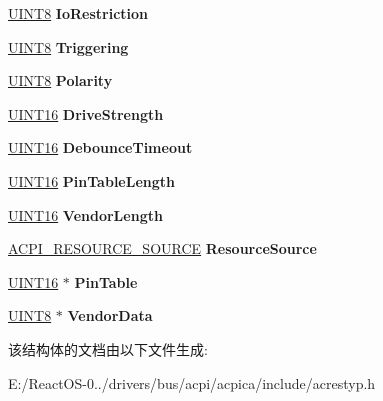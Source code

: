 \begin{DoxyCompactItemize}
\hyperlink{_processor_bind_8h_ab27e9918b538ce9d8ca692479b375b6a}{U\+I\+N\+T8} {\bfseries Io\+Restriction}
\item 
\mbox{\label{structacpi__resource__gpio_a98a0b04b774d7a3d01d40eff5d44b8b1}} 
\hyperlink{_processor_bind_8h_ab27e9918b538ce9d8ca692479b375b6a}{U\+I\+N\+T8} {\bfseries Triggering}
\item 
\mbox{\label{structacpi__resource__gpio_a53ef6838ddfede6fe363c161d59e01bc}} 
\hyperlink{_processor_bind_8h_ab27e9918b538ce9d8ca692479b375b6a}{U\+I\+N\+T8} {\bfseries Polarity}
\item 
\mbox{\label{structacpi__resource__gpio_a9e04e7ceb7b7b0e48348924d81f2b427}} 
\hyperlink{_processor_bind_8h_a09f1a1fb2293e33483cc8d44aefb1eb1}{U\+I\+N\+T16} {\bfseries Drive\+Strength}
\item 
\mbox{\label{structacpi__resource__gpio_a714870784b926d6496b8444b6725a518}} 
\hyperlink{_processor_bind_8h_a09f1a1fb2293e33483cc8d44aefb1eb1}{U\+I\+N\+T16} {\bfseries Debounce\+Timeout}
\item 
\mbox{\label{structacpi__resource__gpio_a045d249fedfdf65b6542f2dc3e8022fb}} 
\hyperlink{_processor_bind_8h_a09f1a1fb2293e33483cc8d44aefb1eb1}{U\+I\+N\+T16} {\bfseries Pin\+Table\+Length}
\item 
\mbox{\label{structacpi__resource__gpio_abf0134c43ab06ab4f4ee8f8932b94fa2}} 
\hyperlink{_processor_bind_8h_a09f1a1fb2293e33483cc8d44aefb1eb1}{U\+I\+N\+T16} {\bfseries Vendor\+Length}
\item 
\mbox{\label{structacpi__resource__gpio_aae4a48ba03004c819f54baac42868a5b}} 
\hyperlink{structacpi__resource__source}{A\+C\+P\+I\+\_\+\+R\+E\+S\+O\+U\+R\+C\+E\+\_\+\+S\+O\+U\+R\+CE} {\bfseries Resource\+Source}
\item 
\mbox{\label{structacpi__resource__gpio_a852e2940a2151e834f147cc5e22f8a3f}} 
\hyperlink{_processor_bind_8h_a09f1a1fb2293e33483cc8d44aefb1eb1}{U\+I\+N\+T16} $\ast$ {\bfseries Pin\+Table}
\item 
\mbox{\label{structacpi__resource__gpio_a3942d565361a1a34ff03a7a094b3219f}} 
\hyperlink{_processor_bind_8h_ab27e9918b538ce9d8ca692479b375b6a}{U\+I\+N\+T8} $\ast$ {\bfseries Vendor\+Data}
\end{DoxyCompactItemize}


该结构体的文档由以下文件生成\+:\begin{DoxyCompactItemize}
\item 
E\+:/\+React\+O\+S-\/0../drivers/bus/acpi/acpica/include/acrestyp.\+h\end{DoxyCompactItemize}
